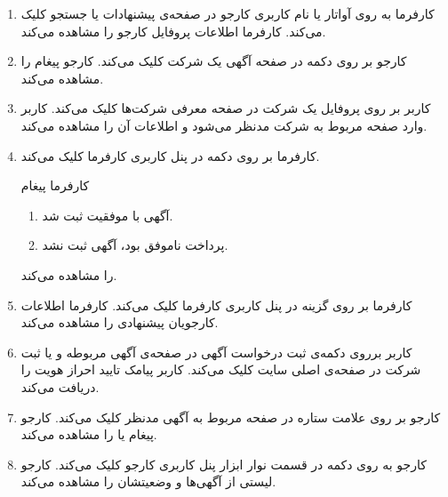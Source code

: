 \begin{enumerate}
	\item[] 
	\tuc				
	{کارفرما به روی آواتار یا نام کاربری کارجو در صفحه‌ی پیشنهادات یا جستجو کلیک می‌کند.}				
	{کارفرما اطلاعات پروفایل کارجو را مشاهده می‌کند.}
	
	\item[] \label{uc:resume}
	\tuc				
	{کارجو بر روی دکمه  در صفحه آگهی یک شرکت کلیک می‌کند.}
	{کارجو پیغام  را مشاهده می‌کند.}
	
	\item[] \label{uc:company-profile}
	\tuc				
	{کاربر بر روی پروفایل یک شرکت در صفحه معرفی شرکت‌ها کلیک می‌کند.}				
	{کاربر وارد صفحه مربوط به شرکت مدنظر می‌شود و اطلاعات آن را مشاهده می‌کند.}
	\renewcommand{\labelenumi}{\alph{enumi})}
	
	\item[] 
	\tuc
	{کارفرما بر روی دکمه  در پنل کاربری کارفرما کلیک می‌کند.}
	{کارفرما پیغام 
		\begin{enumerate}
			\item 
			آگهی با موفقیت ثبت شد.
			\item 
			پرداخت ناموفق بود، آگهی ثبت نشد.
		\end{enumerate} را مشاهده می‌کند.}
	\renewcommand{\labelenumi}{\arabic{enumi})}
	
	\item[] 
	\tuc
	{کارفرما بر روی گزینه  در پنل کاربری کارفرما کلیک می‌کند.}
	{کارفرما اطلاعات کارجویان پیشنهادی را مشاهده می‌کند.}
	
	\item[] 
	\tuc				
	{کاربر برروی دکمه‌ی ثبت درخواست آگهی در صفحه‌ی آگهی مربوطه و یا ثبت شرکت در صفحه‌ی اصلی سایت کلیک می‌کند.}			
	{کاربر پیامک تایید احراز هویت را دریافت می‌کند.}
	
	\item[] \label{uc:bookmark}
	\tuc
	{کارجو بر روی علامت ستاره در صفحه مربوط به آگهی مدنظر کلیک می‌کند.}
	{کارجو پیغام  یا  را مشاهده می‌کند.}
	
	\item[] \label{uc:see-reqs}
	\tuc		
	{کارجو به روی دکمه‌  در قسمت نوار ابزار پنل کاربری کارجو کلیک می‌کند.}
	{کارجو لیستی از آگهی‌ها و وضعیتشان را مشاهده می‌کند.}
	

\end{enumerate}
